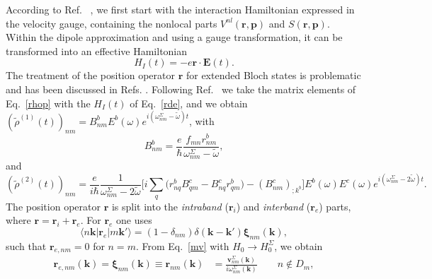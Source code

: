 \documentclass[floatfix,prb,aps,superscriptaddress,showpacs,11pt,preprint,letterpaper]{revtex4}
\def\chon{red}
\begin{document}
{\color{\chon}According to Ref. ~, we first
  start with the interaction  
Hamiltonian expressed in the velocity gauge, containing the nonlocal parts
$V^{nl}(\mathbf{r},\mathbf{p})$ and 
$S (\mathbf{r},\mathbf{p})$. Within the dipole approximation and using a gauge 
transformation, it can be transformed into an effective Hamiltonian 
\cite{valerie}
\begin{equation}
H_{I}(t)=-e\mathbf{r}\cdot \mathbf{E}(t).
\label{rde}
\end{equation}
The treatment of the position operator $\mathbf{r}$ for extended Bloch states 
is problematic and has been discussed in 
Refs. .
Following Ref.~ we take the
matrix elements of Eq.~\eqref{rhop} with the $H_{I}(t)$ of 
Eq.~\eqref{rde}, and we obtain 
$(\tilde{\rho}^{(1)}(t))_{nm}=B_{nm}^{b}E^{b}(\omega)e^{i(\omega^\Sigma_{nm}-\tilde\omega)t}$,
with 
\begin{equation}
B_{nm}^{b}=\frac{e}{\hbar }\frac{f_{mn}r_{nm}^{b}}{\omega^\Sigma_{nm}-\tilde\omega},
\label{j.1}
\end{equation}
and 
\begin{equation}
(\tilde{\rho}^{(2)}(t))_{nm} = \frac{e}{i\hbar }\frac{1}{\omega^\Sigma_{nm}-2\tilde\omega}\bigg[
i\sum_{q }\Big(r_{nq }^{b}B_{q m}^{c}-B_{nq}^{c}r_{q m}^{b}
\Big)  
-(B_{nm}^{c})_{;k^{b}}\bigg]E^{b}(\omega)E^{c}(\omega)e^{i(\omega^\Sigma_{nm}-2\tilde\omega)t}
.
\label{j.2}
\end{equation}}
The position operator
$\mathbf{r}$ is split into the {\it intraband} 
($\mathbf{r}_i$) and {\it interband} ($\mathbf{r}_e$) parts, where 
$\mathbf{r}=\mathbf{r}_i+\mathbf{r}_e$. 
For $\mathbf{r}_e$ one uses
\begin{equation}
\langle n\mathbf{k} | \mathbf{r}_e | m\mathbf{k}'\rangle =
(1-\delta_{nm})\delta(\mathbf{k}-\mathbf{k}')\boldsymbol{\xi}_{nm}(\mathbf{k})
,
\label{rnminn}
\end{equation}
such that $\mathbf{r}_{e,nm}=0$ for $n=m$.
From Eq.~\eqref{mv} with $H_0\to
H^\Sigma_0$, we obtain
\begin{align}
\mathbf{r}_{e,nm}(\mathbf{k}) =
\boldsymbol{\xi}_{nm}(\mathbf{k})\equiv 
\mathbf{r}_{nm}(\mathbf{k}) 
&=
\frac{\mathbf{v}^\Sigma_{nm}(\mathbf{k})}{i\omega^\Sigma_{nm}(\mathbf{k})}
\quad\quad n\notin D_m 
,
\label{pmnrmn}
\end{align}  
\end{document}
